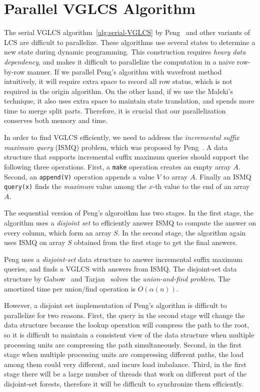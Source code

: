 \section{Parallel VGLCS Algorithm} %
\label{sec:parallelVGLCS}

The serial VGLCS algorithm~\ref{alg:serial-VGLCS} by
Peng~\cite{Peng2011TheLC} and other variants of LCS are difficult to
parallelize.  These algorithms use several states to determine a new
state during dynamic programming.  This construction requires {\em
  heavy data dependency}, and makes it difficult to parallelize the
computation in a naive row-by-row manner.  If we parallel Peng's
algorithm with wavefront method intuitively, it will require extra
space to record all row status, which is not required in the origin
algorithm.  On the other hand, if we use the
Maleki's~\cite{Maleki2016EfficientPU} technique, it also uses extra
space to maintain state translation, and spends more time to merge
split parts.  Therefore, it is crucial that our parallelization
conserves both memory and time.



In order to find VGLCS efficiently, we need to address the {\em
  incremental suffix maximum query} (ISMQ) problem, which was
proposed by Peng~\cite{Peng2011TheLC}.  A data structure that supports
incremental suffix maximum queries should support the following three
operations.  First, a {\tt make} operation creates an empty array $A$.
Second, an {\tt append(V)} operation appends a value $V$ to array $A$.
Finally an ISMQ {\tt query(x)} finds the {\em maximum} value among the
$x$-th value to the end of an array $A$.

The sequential version of Peng's algoroithm has two stages.  In the
first stage, the algorithm uses a {\em disjoint set} to efficiently
answer ISMQ to compute the answer on every column, which form an array
$S$.  In the second stage, the algorithm again uses ISMQ on array $S$
obtained from the first stage to get the final answers.

Peng uses a {\em disjoint-set} data structure to answer incremental
suffix maximum queries, and finds a VGLCS with answers from ISMQ. The
disjoint-set data structure by Gabow~\cite{Gabow1983ALA} and
Tarjan~\cite{Tarjan1975EfficiencyOA} solves the {\em union-and-find
problem}.  The amortized time per union/find operation is
$O(\alpha(n))$.

However, a disjoint set implementation of Peng's algorithm is difficult
to parallelize for two reasons.  First, the query in the second stage
will change the data structure because the lookup operation will
compress the path to the root, so it is difficult to maintain a
consistent view of the data structure when multiple processing units are
compressing the path simultaneously.  Second, in the first stage when
multiple processing units are compressing different paths, the load
among them could very different, and incurs load imbalance.  Third, in
the first stage there will be a large number of threads that work on
different part of the disjoint-set forests, therefore it will be
difficult to synchronize them efficiently.


